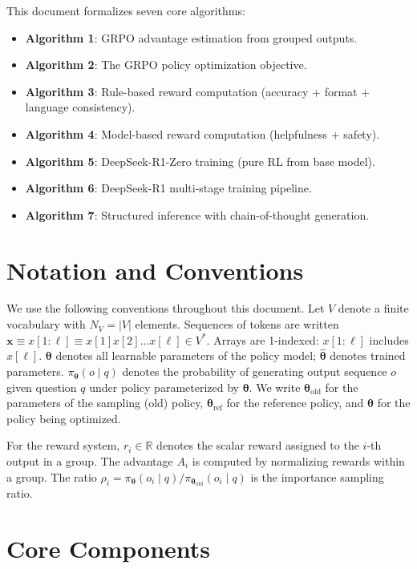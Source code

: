 \documentclass[11pt,a4paper]{article}
\newcommand{\vect}[1]{\bm{#1}}
\newcommand{\R}{\mathbb{R}}
\newcommand{\params}{\bm{\theta}}
\newcommand{\paramshat}{\hat{\bm{\theta}}}
\begin{document}
This document formalizes seven core algorithms:
\begin{itemize}
  \item \textbf{Algorithm 1}: GRPO advantage estimation from grouped outputs.
  \item \textbf{Algorithm 2}: The GRPO policy optimization objective.
  \item \textbf{Algorithm 3}: Rule-based reward computation (accuracy + format + language consistency).
  \item \textbf{Algorithm 4}: Model-based reward computation (helpfulness + safety).
  \item \textbf{Algorithm 5}: DeepSeek-R1-Zero training (pure RL from base model).
  \item \textbf{Algorithm 6}: DeepSeek-R1 multi-stage training pipeline.
  \item \textbf{Algorithm 7}: Structured inference with chain-of-thought generation.
\end{itemize}

\section{Notation and Conventions}

We use the following conventions throughout this document.
Let $V$ denote a finite vocabulary with $N_V = |V|$ elements.
Sequences of tokens are written $\vect{x} \equiv x[1:\ell] \equiv x[1]x[2]\ldots x[\ell] \in V^*$.
Arrays are 1-indexed: $x[1:\ell]$ includes $x[\ell]$.
$\params$ denotes all learnable parameters of the policy model; $\paramshat$ denotes trained parameters.
$\pi_{\params}(o \mid q)$ denotes the probability of generating output sequence $o$ given question $q$ under policy parameterized by $\params$.
We write $\params_{\mathrm{old}}$ for the parameters of the sampling (old) policy, $\params_{\mathrm{ref}}$ for the reference policy, and $\params$ for the policy being optimized.

For the reward system, $r_i \in \R$ denotes the scalar reward assigned to the $i$-th output in a group. The advantage $A_i$ is computed by normalizing rewards within a group. The ratio $\rho_i = \pi_{\params}(o_i \mid q) / \pi_{\params_{\mathrm{old}}}(o_i \mid q)$ is the importance sampling ratio.

\section{Core Components}
\end{document}
